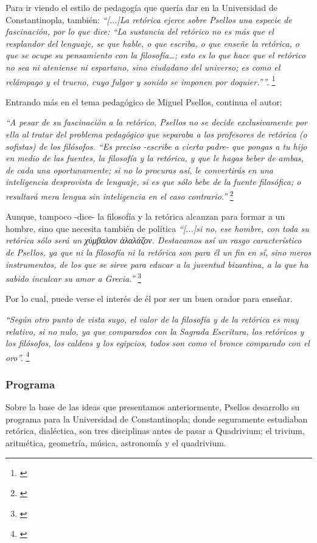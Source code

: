 Para ir viendo el estilo de pedagogía que quería dar en la 
Universidad de Constantinopla, también: \textit{“[...]La retórica ejerce 
sobre Psellos una especie de fascinación, por lo que dice: 
“La sustancia del retórico no es más que el resplandor del lenguaje, 
se que hable, o que escriba, o que enseñe la retórica, 
o que se ocupe su pensamiento con la filosofía…; esto es lo que 
hace que el retórico no sea ni ateniense ni espartano, sino ciudadano 
del universo; es como el relámpago y el trueno, cuyo fulgor y sonido 
se imponen por doquier.””.}
\footnote{\cite[p.~161]{filosofia}}

Entrando más en el tema pedagógico de Miguel Psellos, continua el autor:

\textit{“A pesar de su fascinación a la retórico, Psellos no se decide 
exclusivamente por ella al tratar del problema pedagógico que separaba 
a los profesores de retórica (o sofistas) de los filósofos. 
“Es preciso -escribe a cierto padre- que pongas a tu hijo en medio de 
las fuentes, la filosofía y la retórica, y que le hagas beber de ambas, 
de cada una oportunamente; si no lo procuras así, le convertirás en 
una inteligencia desprovista de lenguaje, si es que sólo bebe de la 
fuente filosófica; o resultará mera lengua sin inteligencia en el 
caso contrario.”}
\footnote{\cite[p.~161]{filosofia}}

Aunque, tampoco -dice- la filosofía y la retórica alcanzan para formar a un hombre,
sino que necesita también de política
\textit{“[...]si no, ese hombre, con toda su 
retórica sólo será un 
	χύμβαλον άλαλάζον.
 Destacamos así un rasgo característico de Psellos, ya que ni la 
 filosofía ni la retórica son para él un fin en sí, sino meros 
 instrumentos, de los que se sirve para educar a la juventud bizantina, 
 a la que ha sabido inculcar su amor a Grecia.”}
 \footnote{\cite[p.~161]{filosofia}}

Por lo cual, puede verse el interés de él por ser un buen 
orador para enseñar.

\textit{“Según otro punto de vista suyo, el valor de la filosofía y de la 
retórica es muy relativo, si no nulo, ya que comparados con la 
Sagrada Escritura, los retóricos y los filósofos, 
los caldeos y los egipcios, todos son como el 
bronce comparado con el oro”.}
\footnote{\cite[p.~161]{filosofia}}

\subsubsection{Programa}
Sobre la base de las ideas que presentamos anteriormente,
Psellos desarrollo su 
programa para la Universidad de Constantinopla; donde seguramente
estudiaban retórica, dialéctica, son tres disciplinas antes
de pasar a Quadrivium;
el trivium, aritmética, geometría, 
música, astronomía y el quadrivium.

